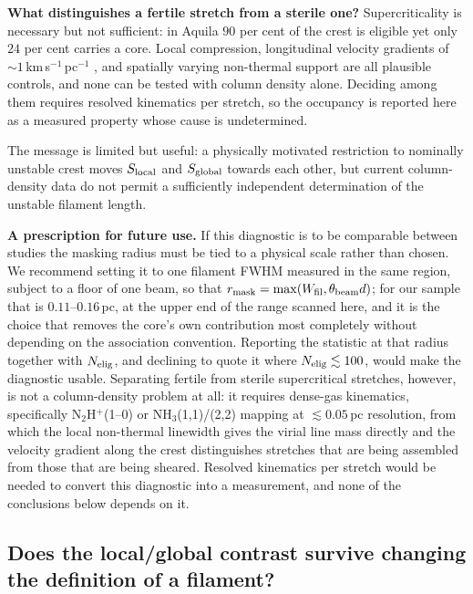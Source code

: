 \documentclass[usenatbib,twoside,twocolumn]{mnras}
\begin{document}
\smallskip\noindent\textbf{What distinguishes a fertile stretch from a sterile one?} Supercriticality is necessary but not sufficient: in Aquila $90$ per cent of the crest is eligible yet only $24$ per cent carries a core. Local compression, longitudinal velocity gradients of $\sim1$\,km\,s$^{-1}$\,pc$^{-1}$ \citep{Kirk2013,Hacar2013}, and spatially varying non-thermal support are all plausible controls, and none can be tested with column density alone. Deciding among them requires resolved kinematics per stretch, so the occupancy is reported here as a measured property whose cause is undetermined.

The message is limited but useful: a physically motivated restriction to nominally unstable crest moves $S_{\rm local}$ and $S_{\rm global}$ towards each other, but current column-density data do not permit a sufficiently independent determination of the unstable filament length.

\smallskip\noindent\textbf{A prescription for future use.} If this diagnostic is to be comparable between studies the masking radius must be tied to a physical scale rather than chosen. We recommend setting it to one filament FWHM measured in the same region, subject to a floor of one beam, so that $r_{\rm mask}=\max(W_{\rm fil},\theta_{\rm beam}d)$; for our sample that is $0.11$--$0.16$\,pc, at the upper end of the range scanned here, and it is the choice that removes the core's own contribution most completely without depending on the association convention. Reporting the statistic at that radius together with $N_{\rm elig}$, and declining to quote it where $N_{\rm elig}\lesssim100$, would make the diagnostic usable. Separating fertile from sterile supercritical stretches, however, is not a column-density problem at all: it requires dense-gas kinematics, specifically N$_2$H$^+$(1--0) or NH$_3$(1,1)/(2,2) mapping at $\lesssim0.05$\,pc resolution, from which the local non-thermal linewidth gives the virial line mass directly and the velocity gradient along the crest distinguishes stretches that are being assembled from those that are being sheared. Resolved kinematics per stretch would be needed to convert this diagnostic into a measurement, and none of the conclusions below depends on it.

\subsection{Does the local/global contrast survive changing the definition of a filament?}
\label{sec:ontology}
\end{document}
